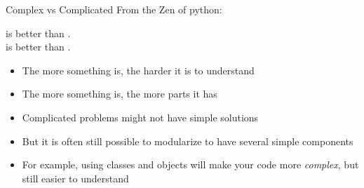 \begin{frame}{Complex vs Complicated}
	From the Zen of python:
	
	\bigskip
	\begin{center}
		 is better than .\\
		 is better than .
	\end{center}
	\bigskip
	
	\begin{itemize}
		\item The more  something is, the harder it is to understand
		\item The more  something is, the more parts it has
	\end{itemize}

	\bigskip
	\begin{itemize}
		\item Complicated problems might not have simple solutions
		\item But it is often still possible to modularize to have several simple components
	\end{itemize}

	\bigskip
	\begin{itemize}
		\item For example, using classes and objects will make your code more \emph{complex}, but still easier to understand
	\end{itemize}
\end{frame}




